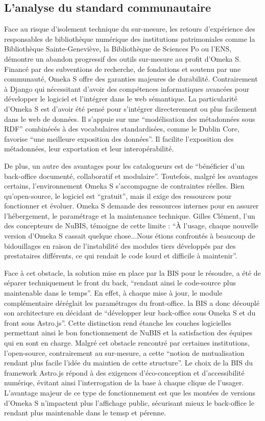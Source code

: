 \subsection{L'analyse du standard communautaire}
 Face au risque d'isolement technique du sur-mesure, les retours d'expérience des responsables de bibliothèque numérique des institutions patrimoniales comme la Bibliothèque Sainte-Geneviève, la Bibliothèque de Sciences Po ou l'ENS, démontre un abandon progressif des outils sur-mesure au profit d'Omeka S. Financé par des subventions de recherche, de fondations et soutenu par une communauté, Omeka S offre des garanties majeures de durabilité. Contrairement à Django qui nécessitant d'avoir des compétences informatiques avancées pour développer le logiciel et l'intégrer dans le web sémantique. La particularité d'Omeka S est d'avoir été pensé pour s'intégrer directerement ou plus facilement dans le web de données. Il s'appuie sur une \enquote{modélisation des métadonnées sous RDF} combinéeés à des vocabulaires standardisées, comme le Dublin Core, favorise \enquote{une meilleure exposition des données}. Il facilite l'exposition des métadonnées, leur exportation et leur interopérabilité. 
 
 De plus, un autre des avantages pour les catalogueurs est de \enquote{bénéficier d'un back-office documenté, collaboratif et modulaire}. Toutefois, malgré les avantages certains, l'environnement Omeka S s'accompagne de contraintes réelles. Bien qu'open-source, le logiciel est \enquote{gratuit}, mais il exige des ressources pour fonctionner et évoluer. Omeka S demande des ressources internes pour en assurer l'hébergement, le paramétrage et la maintenance technique. Gilles Clément, l'un des concepteurs de NuBIS, témoigne de cette limite : \enquote{À l'usage, chaque nouvelle version d'Omeka S cassait quelque chose...Nous étions confrontés à beaucoup de bidouillages en raison de l'instabilité des modules tiers développés par des prestataires différents, ce qui rendait le code lourd et difficile à maintenir}.
 
 Face à cet obstacle, la solution mise en place par la BIS pour le résoudre, a été de séparer techniquement le front du back, \enquote{rendant ainsi le code-source plus maintenable dans le temps}. En effet, à chaque mise à jour, le module complémentaire déréglait les paramétrages du front-office. la BIS a donc découplé son architecture en décidant de \enquote{développer leur back-office sous Omeka S et du front sous Astro.js}. Cette distinction rend étanche les couches logicielles permettant ainsi le bon fonctionnement de NuBIS et la satisfaction des équipes qui en sont en charge. Malgré cet obstacle rencontré par certaines institutions, l'open-source, contrairement au sur-mesure, a cette \enquote{notion de mutualisation rendant plus facile l'idée du maintien de cette structure}. Le choix de la BIS du framework Astro.js répond à des exigences d'éco-conception et d'accessibilité numériqe, évitant ainsi l'interrogation de la base à chaque clique de l'usager. L'avantage majeur de ce type de fonctionnement est que les montées de versions d'Omeka S n'impactent plus l'affichage public, sécurisant mieux le back-office le rendant plus maintenable dans le temsp et pérenne.